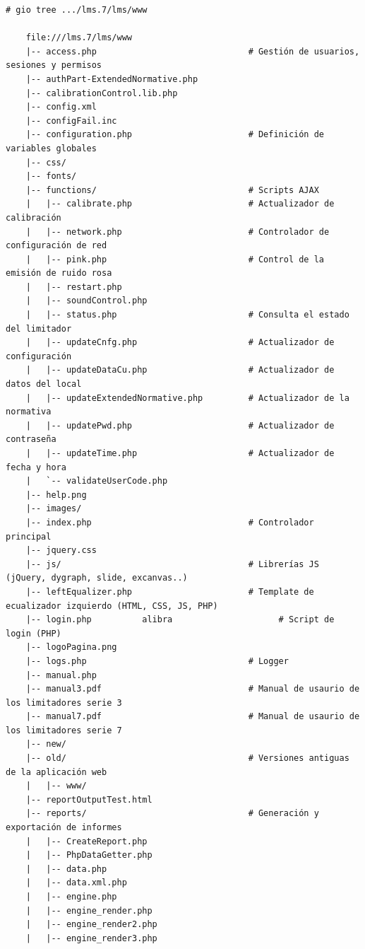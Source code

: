 \begin{lstlisting}[label={lst:lm7-www-treeview}, caption={Estructura de directorios y ficheros de la interfaz web}]
    # gio tree .../lms.7/lms/www

    file:///lms.7/lms/www
    |-- access.php                              # Gestión de usuarios, sesiones y permisos
    |-- authPart-ExtendedNormative.php
    |-- calibrationControl.lib.php
    |-- config.xml
    |-- configFail.inc
    |-- configuration.php                       # Definición de variables globales
    |-- css/
    |-- fonts/
    |-- functions/                              # Scripts AJAX
    |   |-- calibrate.php                       # Actualizador de calibración
    |   |-- network.php                         # Controlador de configuración de red
    |   |-- pink.php                            # Control de la emisión de ruido rosa
    |   |-- restart.php
    |   |-- soundControl.php
    |   |-- status.php                          # Consulta el estado del limitador
    |   |-- updateCnfg.php                      # Actualizador de configuración
    |   |-- updateDataCu.php                    # Actualizador de datos del local
    |   |-- updateExtendedNormative.php         # Actualizador de la normativa
    |   |-- updatePwd.php                       # Actualizador de contraseña
    |   |-- updateTime.php                      # Actualizador de fecha y hora
    |   `-- validateUserCode.php
    |-- help.png
    |-- images/
    |-- index.php                               # Controlador principal
    |-- jquery.css
    |-- js/                                     # Librerías JS (jQuery, dygraph, slide, excanvas..)
    |-- leftEqualizer.php                       # Template de ecualizador izquierdo (HTML, CSS, JS, PHP)
    |-- login.php          alibra                     # Script de login (PHP)
    |-- logoPagina.png
    |-- logs.php                                # Logger
    |-- manual.php
    |-- manual3.pdf                             # Manual de usaurio de los limitadores serie 3
    |-- manual7.pdf                             # Manual de usaurio de los limitadores serie 7
    |-- new/
    |-- old/                                    # Versiones antiguas de la aplicación web
    |   |-- www/
    |-- reportOutputTest.html
    |-- reports/                                # Generación y exportación de informes
    |   |-- CreateReport.php
    |   |-- PhpDataGetter.php
    |   |-- data.php
    |   |-- data.xml.php
    |   |-- engine.php
    |   |-- engine_render.php
    |   |-- engine_render2.php
    |   |-- engine_render3.php

\end{lstlisting}
